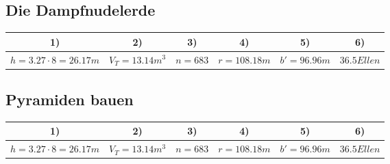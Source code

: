 \documentclass[a4paper, 9pt]{scrartcl}\usepackage[]{graphicx}\usepackage[]{xcolor}
\newenvironment{knitrout}{}{} %
\begin{document}
\subsection*{Die Dampfnudelerde}
\begin{knitrout}
\color{fgcolor}\begin{table}[!h]
\centering\begingroup\fontsize{10}{12}\selectfont

\begin{tabular}{cccccc}
\toprule
\textbf{1)} & \textbf{2)} & \textbf{3)} & \textbf{4)} & \textbf{5)} & \textbf{6)}\\
\midrule
$h = 3.27 
                                            \cdot 8 = 26.17m$ & $V_{T} = 13.14m^3$ & $n = 683$ & $r = 108.18m$ & $b' = 96.96m$ & $36.5Ellen$\\
\bottomrule
\end{tabular}
\endgroup{}
\end{table}

\end{knitrout}
\subsection*{Pyramiden bauen}
\begin{knitrout}
\color{fgcolor}\begin{table}[!h]
\centering\begingroup\fontsize{10}{12}\selectfont

\begin{tabular}{cccccc}
\toprule
\textbf{1)} & \textbf{2)} & \textbf{3)} & \textbf{4)} & \textbf{5)} & \textbf{6)}\\
\midrule
$h = 3.27 
                                            \cdot 8 = 26.17m$ & $V_{T} = 13.14m^3$ & $n = 683$ & $r = 108.18m$ & $b' = 96.96m$ & $36.5Ellen$\\
\bottomrule
\end{tabular}
\endgroup{}
\end{table}

\end{knitrout}
\end{document}
